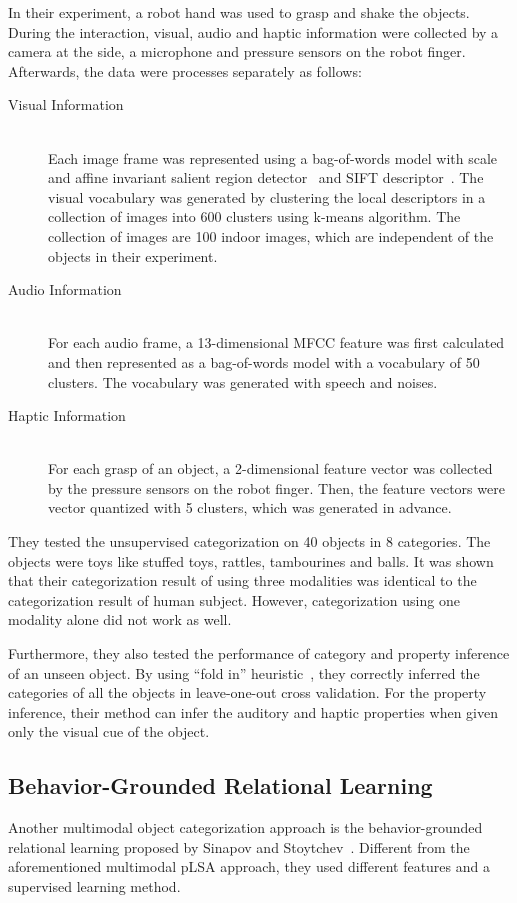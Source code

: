 \documentclass[12pt,final,twoside]{report}
\theoremstyle{plain}
\theoremstyle{definition}
\theoremstyle{remark}
\begin{document}
In their experiment, a robot hand was used to grasp and shake the objects. During the interaction, visual, audio and haptic information were collected by a camera at the side, a microphone and pressure sensors on the robot finger. Afterwards, the data were processes separately as follows:
\begin{description}
  \item[Visual Information] \hfill \\
    Each image frame was represented using a bag-of-words model with scale and affine invariant salient region detector~\cite{mikolajczyk_scale_2004} and SIFT descriptor~\cite{lowe_distinctive_2004}. The visual vocabulary was generated by clustering the local descriptors in a collection of images into 600 clusters using k-means algorithm. The collection of images are 100 indoor images, which are independent of the objects in their experiment.
  \item[Audio Information] \hfill \\
    For each audio frame, a 13-dimensional MFCC feature was first calculated and then represented as a bag-of-words model with a vocabulary of 50 clusters. The vocabulary was generated with speech and noises.
  \item[Haptic Information] \hfill \\
    For each grasp of an object, a 2-dimensional feature vector was collected by the pressure sensors on the robot finger. Then, the feature vectors were vector quantized with 5 clusters, which was generated in advance.
\end{description}

They tested the unsupervised categorization on 40 objects in 8 categories. The objects were toys like stuffed toys, rattles, tambourines and balls. It was shown that their categorization result of using three modalities was identical to the categorization result of human subject. However, categorization using one modality alone did not work as well.

Furthermore, they also tested the performance of category and property inference of an unseen object. By using ``fold in'' heuristic~\cite{hofmann_probabilistic_1999}, they correctly inferred the categories of all the objects in leave-one-out cross validation. For the property inference, their method can infer the auditory and haptic properties when given only the visual cue of the object.

\subsection{Behavior-Grounded Relational Learning}
Another multimodal object categorization approach is the behavior-grounded relational learning proposed by Sinapov and Stoytchev~\cite{sinapov_object_2011}. Different from the aforementioned multimodal pLSA approach, they used different features and a supervised learning method.
\end{document}
